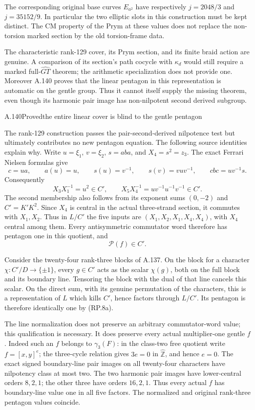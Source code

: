The corresponding original base curves
$E_{a^2}$ have respectively $j=2048/3$ and
$j=35152/9$. In particular the two elliptic
slots in this construction must be kept
distinct. The CM property of the Prym at
these values does not replace the non-torsion
marked section by the old torsion-frame data.

The characteristic rank-129 cover, its
Prym section, and its finite braid action
are genuine. A comparison of its section's
path cocycle with $\kappa_d$ would still
require a marked full-$\widehat{GT}$ theorem;
the arithmetic specialization does not
provide one. Moreover A.140 proves that
the linear pentagon in this representation
is automatic on the gentle group. Thus
it cannot itself supply the missing theorem,
even though its harmonic pair image has
non-nilpotent second derived subgroup.

\begin{statement}{A.140}{Proved}{the entire linear cover is blind to the gentle pentagon}
\end{statement}
The rank-129 construction passes the pair-second-derived
nilpotence test but ultimately contributes no new pentagon
equation. The following source identities explain why.
Write $u=\xi_1$, $v=\xi_2$, $s=aba$, and
$X_4=s^2=z_3$. The exact Ferrari Nielsen formulas give
\[
 c=ua,\qquad a(u)=u,\qquad
 s(u)=v^{-1},\qquad s(v)=vuv^{-1},\qquad
 cbc=uv^{-1}s.
\]
Consequently
\[
 X_3X_1^{-1}=u^2\in C',\qquad
 X_5X_4^{-1}=uv^{-1}u^{-1}v^{-1}\in C'.
 \tag{RP.8a}
\]
The second membership also follows from its exponent sums
$(0,-2)$ and $C'=K'K^2$. Since $X_4$ is central in
the actual three-strand section, it commutes with
$X_1,X_2$. Thus in $L/C'$ the five inputs are
$(X_1,X_2,X_1,X_4,X_4)$, with $X_4$ central among
them. Every antisymmetric commutator word therefore
has pentagon one in this quotient, and
\[
                         \mathcal P(f)\in C'.
 \tag{RP.8b}
\]

Consider the twenty-four rank-three blocks of A.137.
On the block for a character $\chi:C'/D\to\{\pm1\}$,
every $g\in C'$ acts as the scalar $\chi(g)$, both
on the full block and its boundary line. Tensoring
the block with the dual of that line cancels this
scalar. On the direct sum, with its genuine
permutation of the characters, this is a representation
of $L$ which kills $C'$, hence factors through $L/C'$.
Its pentagon is therefore identically one by (RP.8a).

The line normalization does not preserve an arbitrary
commutator-word value; this qualification is necessary.
It does preserve every actual multiplier-one gentle
$f$. Indeed such an $f$ belongs to $\gamma_3(F)$:
in the class-two free quotient write $f=[x,y]^e$;
the three-cycle relation gives $3e=0$ in
$\widehat{\mathbb Z}$, and hence $e=0$.
The exact signed boundary-line pair images on all
twenty-four characters have nilpotency class at most
two. The two harmonic pair images have lower-central
orders $8,2,1$; the other three have orders $16,2,1$.
Thus every actual $f$ has boundary-line value one
in all five factors. The normalized and original
rank-three pentagon values coincide.

